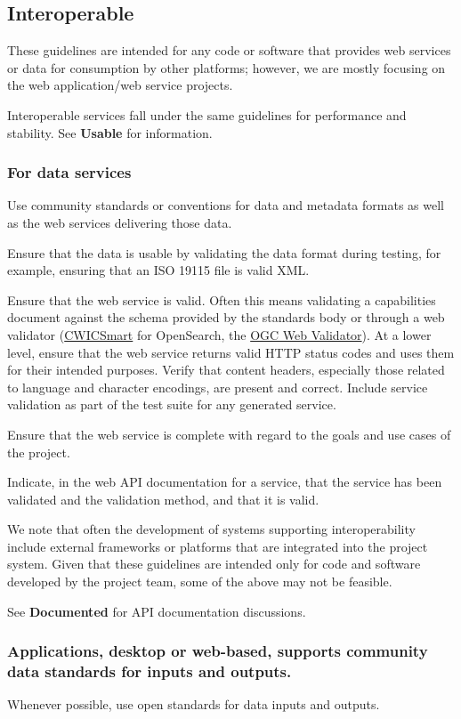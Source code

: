 \documentclass{article}
\begin{document}
\subsection{Interoperable}
These guidelines are intended for any code or software that provides web services or data for consumption by other platforms; however, we are mostly focusing on the web application/web service projects.
 
Interoperable services fall under the same guidelines for performance and stability. See \textbf{Usable} for information.

\subsubsection{For data services}
Use community standards or conventions for data and metadata formats as well as the web services delivering those data. 
 
Ensure that the data is usable by validating the data format during testing, for example, ensuring that an ISO 19115 file is valid XML.
 
Ensure that the web service is valid. Often this means validating a capabilities document against the schema provided by the standards body or through a web validator (\href{http://testbed.echo.nasa.gov/cwic-smart/validations} {CWICSmart} for OpenSearch, the \href{http://cite.opengeospatial.org/teamengine/} {OGC Web Validator}). At a lower level, ensure that the web service returns valid HTTP status codes and uses them for their intended purposes. Verify that content headers, especially those related to language and character encodings, are present and correct. Include service validation as part of the test suite for any generated service.
 
Ensure that the web service is complete with regard to the goals and use cases of the project. 
 
Indicate, in the web API documentation for a service, that the service has been validated and the validation method, and that it is valid.
 
We note that often the development of systems supporting interoperability include external frameworks or platforms that are integrated into the project system. Given that these guidelines are intended only for code and software developed by the project team, some of the above may not be feasible. 
 
See \textbf{Documented} for API documentation discussions.

\subsubsection{Applications, desktop or web-based, supports community data standards for inputs and outputs.}
Whenever possible, use open standards for data inputs and outputs. 
\end{document}
